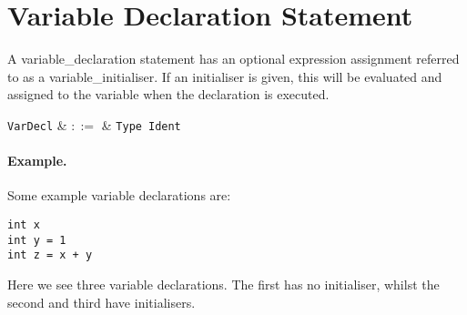 
\section{Variable Declaration Statement}
\label{c_stmts_var_decl}
A \gls{variable_declaration} statement has an optional expression assignment referred to as a \gls{variable_initialiser}.  If an initialiser is given, this will be evaluated and assigned to the variable when the declaration is executed.  

\begin{syntax}
  \verb+VarDecl+ & $::=$ & \verb+Type+\ \verb+Ident+\ \big[\
  \token{=}\ \verb+Expr+\ \big]\\
\end{syntax}

\paragraph{Example.} Some example variable declarations are:
\begin{lstlisting}
int x
int y = 1
int z = x + y
\end{lstlisting}
Here we see three variable declarations.  The first has no initialiser, whilst the second and third have initialisers.
